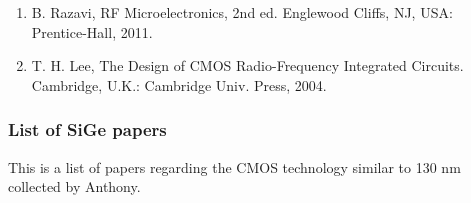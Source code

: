 \begin{enumerate} %
	\item B. Razavi, RF Microelectronics, 2nd ed. Englewood Cliffs, NJ, USA: Prentice-Hall, 2011. 
	\item T. H. Lee, The Design of CMOS Radio-Frequency Integrated Circuits. Cambridge, U.K.: Cambridge Univ. Press, 2004.
\end{enumerate}



\subsubsection*{List of SiGe papers}

This is a list of papers regarding the CMOS technology similar to 130 nm collected by Anthony.


